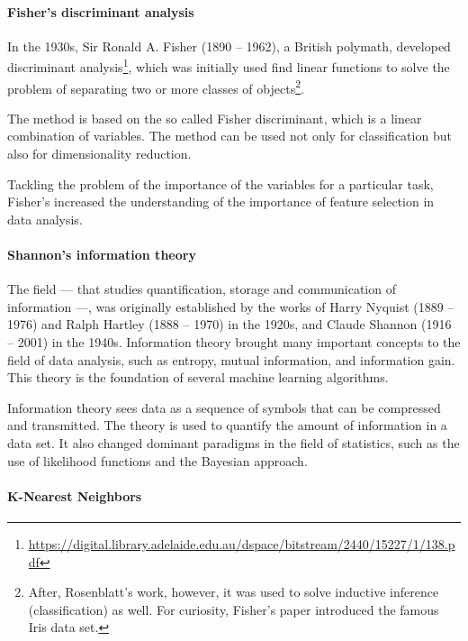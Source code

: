 \paragraph{Fisher's discriminant analysis}

In the 1930s, Sir Ronald A. Fisher (1890 -- 1962), a British polymath, developed
discriminant analysis\footnote{\url{https://digital.library.adelaide.edu.au/dspace/bitstream/2440/15227/1/138.pdf}},
which was initially used find linear functions to solve the problem of separating two or
more classes of objects\footnote{After, Rosenblatt's work, however, it was used to solve
inductive inference (classification) as well.  For curiosity, Fisher's paper
introduced the famous Iris data set.}.

The method is based on the so called Fisher discriminant, which is a linear
combination of variables.  The method can be used not only for classification but also for
dimensionality reduction.

Tackling the problem of the importance of the variables for a particular task, Fisher's
increased the understanding of the importance of feature selection in data analysis.


\paragraph{Shannon's information theory}

The field --- that studies quantification, storage and communication of information ---, was
originally established by the works of Harry Nyquist (1889 -- 1976) and Ralph Hartley
(1888 -- 1970) in the 1920s, and Claude Shannon (1916 -- 2001) in the 1940s.
Information theory brought many important concepts to the field of data analysis, such as
entropy, mutual information, and information gain.  This theory is the foundation of
several machine learning algorithms.

Information theory sees data as a sequence of symbols that can be compressed and
transmitted.  The theory is used to quantify the amount of information in a data set.
It also changed dominant paradigms in the field of statistics, such as the use of
likelihood functions and the Bayesian approach.


\paragraph{K-Nearest Neighbors}

